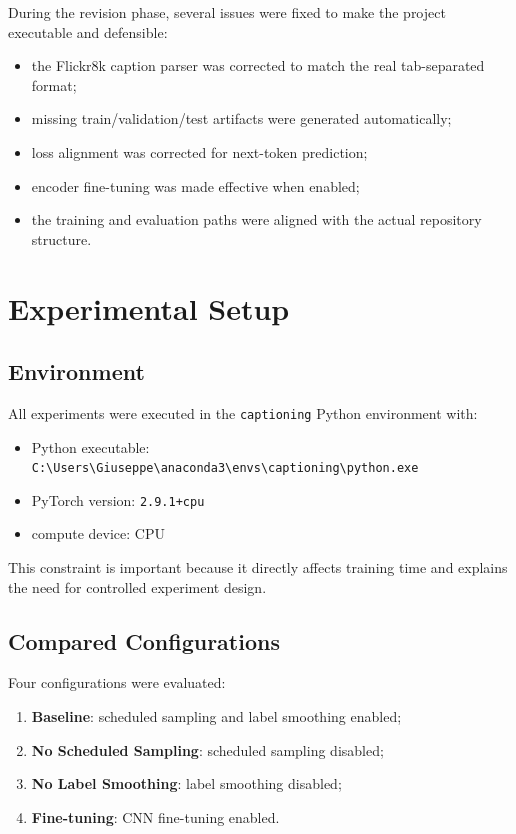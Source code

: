 \documentclass[11pt,a4paper]{article}
\begin{document}
During the revision phase, several issues were fixed to make the project executable and defensible:
\begin{itemize}[leftmargin=*]
    \item the Flickr8k caption parser was corrected to match the real tab-separated format;
    \item missing train/validation/test artifacts were generated automatically;
    \item loss alignment was corrected for next-token prediction;
    \item encoder fine-tuning was made effective when enabled;
    \item the training and evaluation paths were aligned with the actual repository structure.
\end{itemize}

\section{Experimental Setup}

\subsection{Environment}

All experiments were executed in the \texttt{captioning} Python environment with:
\begin{itemize}[leftmargin=*]
    \item Python executable: \texttt{C:\textbackslash Users\textbackslash Giuseppe\textbackslash anaconda3\textbackslash envs\textbackslash captioning\textbackslash python.exe}
    \item PyTorch version: \texttt{2.9.1+cpu}
    \item compute device: CPU
\end{itemize}

This constraint is important because it directly affects training time and explains the need for controlled experiment design.

\subsection{Compared Configurations}

Four configurations were evaluated:
\begin{enumerate}[leftmargin=*]
    \item \textbf{Baseline}: scheduled sampling and label smoothing enabled;
    \item \textbf{No Scheduled Sampling}: scheduled sampling disabled;
    \item \textbf{No Label Smoothing}: label smoothing disabled;
    \item \textbf{Fine-tuning}: CNN fine-tuning enabled.
\end{enumerate}
\end{document}
